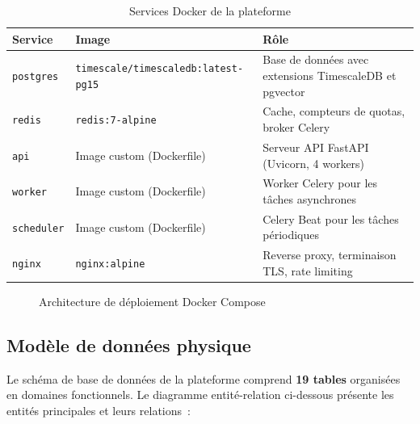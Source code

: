 \begin{table}[H]
\centering
\caption{Services Docker de la plateforme}
\label{tab:docker_services}
\begin{tabularx}{\textwidth}{|l|l|X|}
\hline
\textbf{Service} & \textbf{Image} & \textbf{Rôle} \\
\hline
\texttt{postgres} & \texttt{timescale/timescaledb:latest-pg15} & Base de données avec extensions TimescaleDB et pgvector \\
\hline
\texttt{redis} & \texttt{redis:7-alpine} & Cache, compteurs de quotas, broker Celery \\
\hline
\texttt{api} & Image custom (Dockerfile) & Serveur API FastAPI (Uvicorn, 4 workers) \\
\hline
\texttt{worker} & Image custom (Dockerfile) & Worker Celery pour les tâches asynchrones \\
\hline
\texttt{scheduler} & Image custom (Dockerfile) & Celery Beat pour les tâches périodiques \\
\hline
\texttt{nginx} & \texttt{nginx:alpine} & Reverse proxy, terminaison TLS, rate limiting \\
\hline
\end{tabularx}
\end{table}

\begin{figure}[H]
    \centering
    \caption{Architecture de déploiement Docker Compose}
    \label{fig:docker_arch}
\end{figure}

\subsection{Modèle de données physique}

Le schéma de base de données de la plateforme comprend \textbf{19 tables} organisées en domaines fonctionnels. Le diagramme entité-relation ci-dessous présente les entités principales et leurs relations~:

